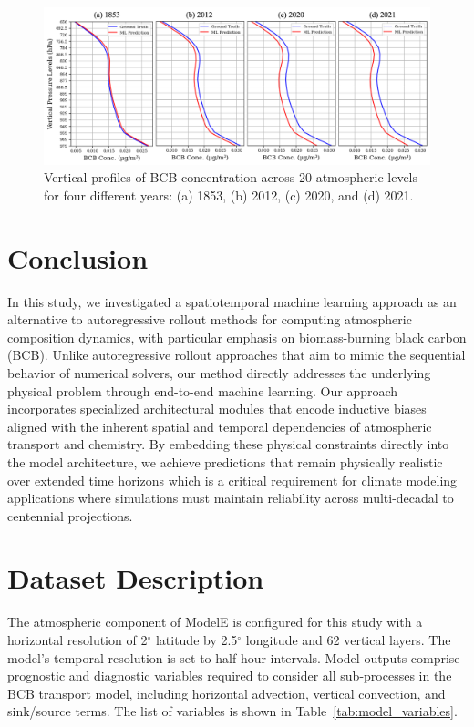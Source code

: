 \documentclass{article}
\begin{document}
    \begin{figure}[htbp]
        \centering
        \includegraphics[width=1\linewidth]{conc_profile-p.png}
        \caption{Vertical profiles of BCB concentration across 20 atmospheric levels for four different years: (a) 1853, (b) 2012, (c) 2020, and (d) 2021.}
        \label{fig:vertical_profile}
    \end{figure}

\section{Conclusion}
    In this study, we investigated a spatiotemporal machine learning approach as an alternative to autoregressive rollout methods for computing atmospheric composition dynamics, with particular emphasis on biomass-burning black carbon (BCB). Unlike autoregressive rollout approaches that aim to mimic the sequential behavior of numerical solvers, our method directly addresses the underlying physical problem through end-to-end machine learning.
    Our approach incorporates specialized architectural modules that encode inductive biases aligned with the inherent spatial and temporal dependencies of atmospheric transport and chemistry. By embedding these physical constraints directly into the model architecture, we achieve predictions that remain physically realistic over extended time horizons which is a critical requirement for climate modeling applications where simulations must maintain reliability across multi-decadal to centennial projections.
    




\newpage \appendix
\section{Dataset Description} \label{sec:appendix-1}
    The atmospheric component of ModelE is configured for this study with a horizontal resolution of 2$^\circ$ latitude by 2.5$^\circ$ longitude and 62 vertical layers. The model's temporal resolution is set to half-hour intervals. Model outputs comprise prognostic and diagnostic variables required to consider all sub-processes in the BCB transport model, including horizontal advection, vertical convection, and sink/source terms. The list of variables is shown in Table~\ref{tab:model_variables}.
\end{document}
